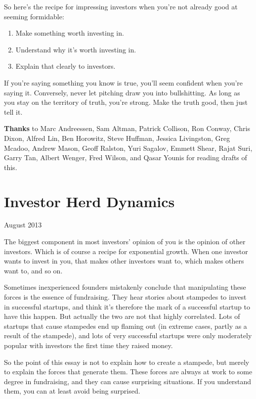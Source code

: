 \documentclass[12pt]{book}
\begin{document}
So here's the recipe for impressing investors when you're not already
good at seeming formidable:

\begin{enumerate}
\def\labelenumi{\arabic{enumi}.}
\item
  Make something worth investing in.
\item
  Understand why it's worth investing in.
\item
  Explain that clearly to investors.
\end{enumerate}

If you're saying something you know is true, you'll seem confident when
you're saying it. Conversely, never let pitching draw you into
bullshitting. As long as you stay on the territory of truth, you're
strong. Make the truth good, then just tell it.


\textbf{Thanks} to Marc Andreessen, Sam Altman, Patrick Collison, Ron
Conway, Chris Dixon, Alfred Lin, Ben Horowitz, Steve Huffman, Jessica
Livingston, Greg Mcadoo, Andrew Mason, Geoff Ralston, Yuri Sagalov,
Emmett Shear, Rajat Suri, Garry Tan, Albert Wenger, Fred Wilson, and
Qasar Younis for reading drafts of this.
\chapter{Investor Herd Dynamics}

August 2013

The biggest component in most investors' opinion of you is the opinion
of other investors. Which is of course a recipe for exponential growth.
When one investor wants to invest in you, that makes other investors
want to, which makes others want to, and so on.

Sometimes inexperienced founders mistakenly conclude that manipulating
these forces is the essence of fundraising. They hear stories about
stampedes to invest in successful startups, and think it's therefore the
mark of a successful startup to have this happen. But actually the two
are not that highly correlated. Lots of startups that cause stampedes
end up flaming out (in extreme cases, partly as a result of the
stampede), and lots of very successful startups were only moderately
popular with investors the first time they raised money.

So the point of this essay is not to explain how to create a stampede,
but merely to explain the forces that generate them. These forces are
always at work to some degree in fundraising, and they can cause
surprising situations. If you understand them, you can at least avoid
being surprised.
\end{document}
